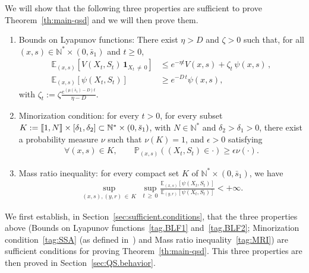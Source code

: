 \documentclass[10pt]{amsart}
\theoremstyle{definition}\newtheorem{defi}[theo]{Definition}\newtheorem{rema}[theo]{Remark}\newtheorem{exam}[theo]{Example}\newtheorem{exem}[theo]{Example}\newtheorem{nota}[theo]{Notation}
\newcommand{\llbracket}{\mathopen{[\mkern -2.7mu[}}
\newcommand{\rrbracket}{\mathclose{]\mkern -2.7mu]}}
\newcommand{\PP}{\mathbb{P}}
\newcommand{\NN}{\mathbb{N}}
\newcommand{\EE}{\mathbb{E}}
\newcommand{\X}{\NN^* \times (0,\bar s_1)}
\newcommand{\barmu}{\mu(\bar s_1)}
\newcommand{\1}{\mathbf{1}}
\let\oldforall\forall
\renewcommand*{\forall}{\mathrel{\oldforall}}
\begin{document}
We will show that the following three properties are sufficient to prove Theorem~\ref{th:main-qsd} and we will then prove them.
\begin{enumerate}
\item\label{hyp:thm-gen-lyap}
Bounds on Lyapunov functions: There exist $\eta>D$ and $\zeta>0$ such that, for all $(x,s)\in \X$ and $t\geq 0$,
\begin{align}\label{tag.BLF1}
\EE_{(x,s)}\left[V(X_t,S_t) \,\1_{X_t\,\neq\,0}\right] &\leq e^{-\eta t} V(x,s) + \zeta_t \, \psi(x,s)\,,
\tag{BLF1}
\\\label{tag.BLF2}
\EE_{(x,s)}\left[\psi(X_t, S_t) \right] &\geq e^{-D\,t} \psi(x,s),
\tag{BLF2}
\end{align}
with $\zeta_t:=\zeta \frac{e^{(\barmu-D)t}}{\eta-D}$.
\item \label{hyp:thm-gen-smallset}
Minorization condition: for every $t>0$, for every subset $K:=\llbracket 1,N\rrbracket\times [\delta_1,\delta_2]\subset \X$, with $N\in \NN^*$ and $\delta_2>\delta_1>0$, there exist a probability measure $\nu$ such that $\nu(K)=1$, and $\epsilon>0$ satisfying
\begin{align}\label{tag:SSA}
\forall (x,s) \in K, \qquad \PP_{(x,s)}((X_t, S_t) \in \cdot)\geq \epsilon \nu(\cdot).
\tag{MC}
\end{align}

\item \label{hyp:thm-gen-ratio}
Mass ratio inequality: for every compact set $K$ of $\X$, we have
\begin{align}\label{tag:MRI}
\sup_{(x,s),(y,r)\,\in\,K}\; \sup_{t\,\geq\,0} \frac{\EE_{(x,s)}\left[\psi(X_t, S_t) \right] }{\EE_{(y,r)}\left[\psi(X_t, S_t) \right] } < + \infty.
\tag{MRI}
\end{align}
\end{enumerate}


We first establish, in Section~\ref{sec:sufficient.conditions}, that the three properties above (Bounds on Lyapunov functions~\eqref{tag.BLF1} and~\eqref{tag.BLF2}; Minorization condition~\eqref{tag:SSA} (as defined in~\cite{MT12}) and Mass ratio inequality~\eqref{tag:MRI}) are sufficient conditions for proving Theorem~\ref{th:main-qsd}. This three properties are then proved in Section~\ref{sec:QS.behavior}.
\end{document}
